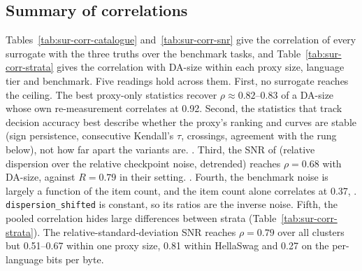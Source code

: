 \subsection{Summary of correlations}
\label{app:sur-results}

Tables~\ref{tab:sur-corr-catalogue} and~\ref{tab:sur-corr-snr} give the correlation of every surrogate with the three truths over the benchmark tasks, and Table~\ref{tab:sur-corr-strata} gives the correlation with DA-size within each proxy size, language tier and benchmark.
Five readings hold across them.
First, no surrogate reaches the ceiling. The best proxy-only statistics recover $\rho \approx 0.82$--$0.83$ of a DA-size whose own re-measurement correlates at 0.92.
Second, the statistics that track decision accuracy best describe whether the proxy's ranking and curves are stable (sign persistence, consecutive Kendall's $\tau$, crossings, agreement with the rung below), not how far apart the variants are. .
Third, the SNR of \citet{heineman_signal_2025} (relative dispersion over the relative checkpoint noise, detrended) reaches $\rho = 0.68$ with DA-size, against $R = 0.79$ in their setting. .
Fourth, the benchmark noise is largely a function of the item count, and the item count alone correlates at 0.37, . \texttt{dispersion\_shifted} is constant, so its ratios are the inverse noise.
Fifth, the pooled correlation hides large differences between strata (Table~\ref{tab:sur-corr-strata}). The relative-standard-deviation SNR reaches $\rho = 0.79$ over all clusters but 0.51--0.67 within one proxy size, 0.81 within HellaSwag and 0.27 on the per-language bits per byte.

